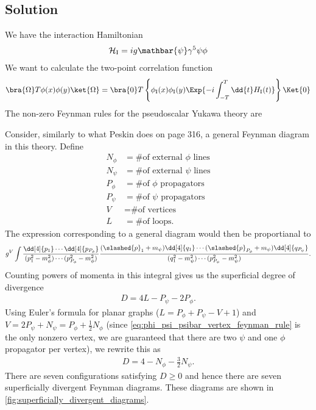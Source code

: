 \subsection*{Solution}
We have the interaction Hamiltonian
\begin{align}
	\mathcal{H}_\mathrm{I} = i g \mathbar{\psi} \gamma^5 \psi \phi
\end{align}
We want to calculate the two-point correlation function
\begin{align}
	\bra{\Omega} T \phi(x) \phi(y) \ket{\Omega} = \bra{0} T \left\{ \phi_\mathrm{I}(x) \phi_\mathrm{I}(y) \Exp{-i \int^T_{-T} \dd{t} H_\mathrm{I}(t)} \right\} \Ket{0}
\end{align}
The non-zero Feynman rules for the pseudoscalar Yukawa theory are

Consider, similarly to what Peskin does on page 316, a general Feynman diagram in this theory. Define
\begin{align*}
	N_\phi &= \textrm{\# of external $\phi$ lines}\\
	N_\psi &= \textrm{\# of external $\psi$ lines}\\
	P_\phi &= \textrm{\# of $\phi$ propagators}\\
	P_\psi &= \textrm{\# of $\psi$ propagators}\\
	V &= \textrm{\# of vertices}\\
	L &= \textrm{\# of loops}.
\end{align*}
The expression corresponding to a general diagram would then be proportianal to
\begin{align}
	g^V \int
	\frac{\dd[4]{p_1} \cdots \dd[4]{p_{P_\phi}}}{(p_1^2 - m_\phi^2) \cdots (p_{P_\phi}^2 - m_\phi^2)}
	\frac{(\slashed{p}_1 + m_\psi) \dd[4]{q_1} \cdots (\slashed{p}_{P_\phi} + m_\psi) \dd[4]{q_{P_\psi}}}{(q_1^2 - m_\psi^2) \cdots (p_{P_\psi}^2 - m_\psi^2)}.
\end{align}
Counting powers of momenta in this integral gives us the superficial degree of divergence
\begin{align}
	D = 4 L - P_\psi - 2 P_\phi.
\end{align}
Using Euler's formula for planar graphs ($L = P_\phi + P_\psi - V + 1$) and $V = 2 P_\psi + N_\psi = P_\phi + \frac{1}{2} N_\phi$ (since \cref{eq:phi_psi_psibar_vertex_feynman_rule} is the only nonzero vertex, we are guaranteed that there are two $\psi$ and one $\phi$ propagator per vertex), we rewrite this as
\begin{align}
	D = 4 - N_\phi - \frac{3}{2} N_\psi.
\end{align}
There are seven configurations satisfying $D \geq 0$ and hence there are seven superficially divergent Feynman diagrams. These diagrams are shown in \cref{fig:superficially_divergent_diagrams}.


